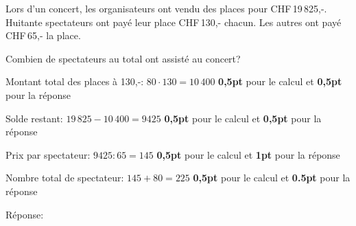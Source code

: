 
\question[5]
Lors d'un concert, les organisateurs ont vendu des places pour CHF\,19\,825,-. Huitante spectateurs ont payé leur place CHF\,130,- chacun. Les autres ont payé CHF\,65,- la place.

\vspace{10pt}Combien de spectateurs au total ont assisté au concert?

\vspace{10pt}{\footnotesize\raggedleft Espace pour ta démarche et tes calculs\par}
	\begin{solutionorgrid}[220pt]
	Montant total des places à 130,-: $80 \cdot 130 = 10\,400$ \hfill \textbf{0,5pt} pour le calcul et \textbf{0,5pt} pour la réponse
	
	Solde restant: $19\,825 - 10\,400 = 9425$ \hfill \textbf{0,5pt} pour le calcul et \textbf{0,5pt} pour la réponse

	Prix par spectateur: $9425 : 65 = 145$  \hfill \textbf{0,5pt} pour le calcul et \textbf{1pt} pour la réponse
	
	Nombre total de spectateur: $145 + 80 = 225$ \hfill \textbf{0,5pt} pour le calcul et \textbf{0.5pt} pour la réponse
	\end{solutionorgrid}
	
\begin{tcolorbox}[enhanced jigsaw, interior hidden, colframe=box, parbox=false]%
Réponse: 
\end{tcolorbox}